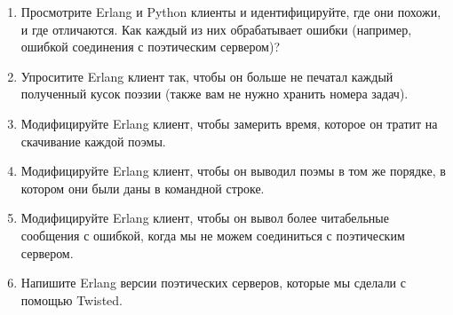 \begin{enumerate}

\item Просмотрите Erlang и Python клиенты и идентифицируйте, где они 
похожи, и где отличаются. Как каждый из них обрабатывает ошибки (например, ошибкой 
соединения с поэтическим сервером)? 

\item Упроситите Erlang клиент так, чтобы он больше не 
печатал каждый полученный кусок поэзии (также вам не нужно хранить номера задач).

\item Модифицируйте Erlang клиент, чтобы замерить время, которое он 
тратит на скачивание каждой поэмы.

\item Модифицируйте Erlang клиент, чтобы он выводил поэмы в том же 
порядке, в котором они были даны в командной строке. 

\item Модифицируйте Erlang клиент, чтобы он вывол более читабельные 
сообщения с ошибкой, когда мы не можем соединиться с поэтическим сервером.

\item Напишите Erlang версии  поэтических серверов, которые мы сделали с помощью Twisted.

\end{enumerate}


